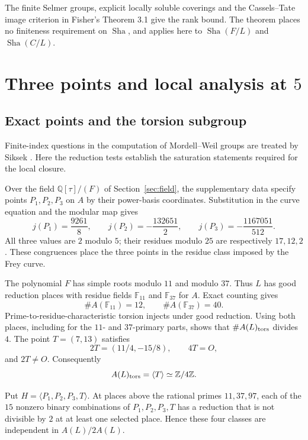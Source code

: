 \documentclass[11pt,a4paper]{article}
\theoremstyle{definition}\newtheorem{definition}[theorem]{Definition}
\theoremstyle{remark}\newtheorem{remark}[theorem]{Remark}
\newcommand{\Q}{\mathbb Q}\newcommand{\Z}{\mathbb Z}\newcommand{\F}{\mathbb F}
\begin{document}
The finite Selmer groups, explicit locally soluble coverings and the Cassels--Tate image criterion in Fisher's Theorem 3.1 give the rank bound. The theorem places no finiteness requirement on $\operatorname{Sha}$, and applies here to $\operatorname{Sha}(F/L)$ and $\operatorname{Sha}(C/L)$.



\section{Three points and local analysis at $5$}\label{sec:points}

\subsection{Exact points and the torsion subgroup}

Finite-index questions in the computation of Mordell--Weil groups are treated by Siksek \cite{Siksek}. Here the reduction tests establish the saturation statements required for the local closure.

Over the field $\Q[\tau]/(F)$ of Section~\ref{sec:field}, the supplementary data specify points $P_1,P_2,P_3$ on $A$ by their power-basis coordinates. Substitution in the curve equation and the modular map gives
\begin{equation}\label{eq:threej}
j(P_1)=\frac{9261}{8},\qquad
j(P_2)=-\frac{132651}{2},\qquad
j(P_3)=-\frac{1167051}{512}.
\end{equation}
All three values are $2$ modulo $5$; their residues modulo $25$ are respectively $17,12,2$. These congruences place the three points in the residue class imposed by the Frey curve.

The polynomial $F$ has simple roots modulo $11$ and modulo $37$.
Thus $L$ has good reduction places with residue fields $\F_{11}$ and
$\F_{37}$ for $A$. Exact counting gives
\[
\#A(\F_{11})=12,\qquad \#A(\F_{37})=40.
\]
Prime-to-residue-characteristic torsion injects under good reduction.
Using both places, including for the $11$- and $37$-primary parts, shows
that $\#A(L)_{\rm tors}$ divides $4$. The point $T=(7,13)$ satisfies
\[
2T=(11/4,-15/8),\qquad4T=O,
\]
and $2T\ne O$. Consequently
\begin{equation}\label{eq:tors}
A(L)_{\rm tors}=\langle T\rangle\simeq\Z/4\Z.
\end{equation}

Put $H=\langle P_1,P_2,P_3,T\rangle$. At places above the rational primes $11,37,97$, each of the $15$ nonzero binary combinations of $P_1,P_2,P_3,T$ has a reduction that is not divisible by $2$ at at least one selected place. Hence these four classes are independent
in $A(L)/2A(L)$.
\end{document}
